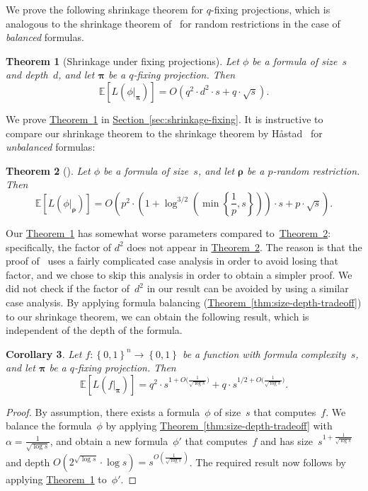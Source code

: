 \documentclass[11pt]{article}
\numberwithin{equation}{section}
\newtheorem{theorem}{Theorem}[section]
\newtheorem{corollary}[theorem]{Corollary}
\theoremstyle{definition}
\theoremstyle{plain}
\newcommand{\expref}[2]{\hyperref[#2]{#1~\ref{#2}}}
\theoremstyle{definition}\newtheorem{notation}[theorem]{Notation}\theoremstyle{plain}
\newcommand{\E}{\mathbb{E}}
\newcommand{\B}{\left\{ 0,1 \right \}}
\newcommand{\p}{\boldsymbol{\pi}}
\newcommand{\rs}{\boldsymbol{\rho}}
\theoremstyle{definition}
\theoremstyle{plain}
\begin{document}
\noindent We prove the following shrinkage theorem for $q$-fixing
projections, which is analogous to the shrinkage theorem of~\cite{H98}
for random restrictions in the case of \emph{balanced} formulas. 
\begin{theorem}[Shrinkage under fixing projections]
\label{thm:shrinkage-fixing}Let $\phi$ be a formula of size~$s$ and
depth~$d$, and let $\p$ be a $q$-fixing projection. Then 
\[
\E\left[L(\phi|_{\p})\right]=O\!\left(q^{2}\cdot d^{2}\cdot s+q\cdot\sqrt{s}\right).
\]
\end{theorem}

\noindent We prove \expref{Theorem}{thm:shrinkage-fixing} in \expref{Section}{sec:shrinkage-fixing}.
It is instructive to compare our shrinkage theorem to the shrinkage
theorem by H{\aa}stad~\cite{H98} for \emph{unbalanced} formulas:
\begin{theorem}[\cite{H98}]
\label{thm:shrinkage-hastad}Let $\phi$ be a formula of size~$s$,
and let $\rs$ be a $p$-random restriction. Then
\[
\E\left[L(\phi|_{\rs})\right]=O\!\left(p^{2}\cdot\left(1+\log^{3/2}\left(\min\left\{ \frac{1}{p},s\right\} \right)\right)\cdot s+p\cdot\sqrt{s}\right).
\]
\end{theorem}

Our \expref{Theorem}{thm:shrinkage-fixing} has somewhat worse parameters compared
to~\expref{Theorem}{thm:shrinkage-hastad}: specifically, the factor of $d^{2}$
does not appear in \expref{Theorem}{thm:shrinkage-hastad}. The reason is that the
proof of~\cite{H98} uses a fairly complicated case analysis in order
to avoid losing that factor, and we chose to skip this analysis in
order to obtain a simpler proof. We did not check if the factor of~$d^{2}$
in our result can be avoided by using a similar case analysis. By
applying formula balancing (\expref{Theorem}{thm:size-depth-tradeoff}) to our shrinkage
theorem, we can obtain the following result, which is independent
of the depth of the formula. 
\begin{corollary}
\label{cor:shrinkage-without-depth-fixing}Let $f\colon\B^{n}\to\B$ be
a function with formula complexity~$s$, and let $\p$ be a $q$-fixing
projection. Then 
\[
\E\left[L(f|_{\p})\right]=q^{2}\cdot s^{1+O\bigl(\frac{1}{\sqrt{\log s}}\bigr)}+q\cdot s^{1/2+O\bigl(\frac{1}{\sqrt{\log s}}\bigr)}.
\]
\end{corollary}

\begin{proof}
By assumption, there exists a formula~$\phi$ of size~$s$ that
computes~$f$. We balance the formula~$\phi$ by applying 
\expref{Theorem}{thm:size-depth-tradeoff}
with $\alpha=\frac{1}{\sqrt{\log s}}$, and obtain a new formula~$\phi'$
that computes~$f$ and has size~$s^{1+\frac{1}{\sqrt{\log s}}}$
and depth $O(2^{\sqrt{\log s}}\cdot\log s)=s^{O(\frac{1}{\sqrt{\log s}})}$.
The required result now follows by applying \expref{Theorem}{thm:shrinkage-fixing}
to~$\phi'$.
\end{proof}
\end{document}
